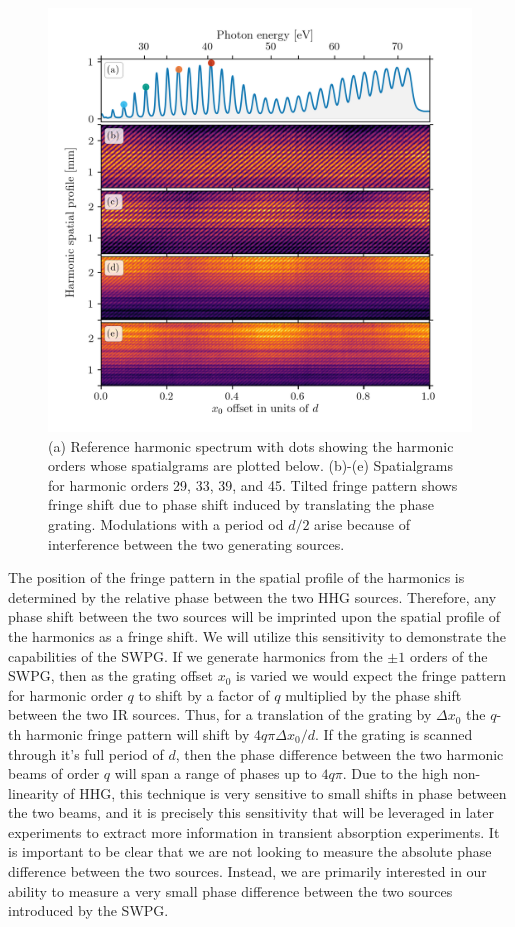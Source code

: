 \begin{figure}
	\centering
	\includegraphics[width=1.0\textwidth]{figures/Two_source/harmonic_spatialgrams.png}
	\caption{(a) Reference harmonic spectrum with dots showing the harmonic orders whose spatialgrams are plotted below. (b)-(e) Spatialgrams for harmonic orders 29, 33, 39, and 45.  Tilted fringe pattern shows fringe shift due to phase shift induced by translating the phase grating. Modulations with a period od $d/2$ arise because of interference between the two generating sources.}
	\label{fig:harmonic_spatialgrams}
\end{figure}

The position of the fringe pattern in the spatial profile of the harmonics is determined by the relative phase between the two HHG sources.  Therefore, any phase shift between the two sources will be imprinted upon the spatial profile of the harmonics as a fringe shift.  We will utilize this sensitivity to demonstrate the capabilities of the SWPG.  If we generate harmonics from the $\pm1$ orders of the SWPG, then as the grating offset $x_0$ is varied we would expect the fringe pattern for harmonic order $q$ to shift by a factor of $q$ multiplied by the phase shift between the two IR sources. Thus, for a translation of the grating by $\Delta x_0$ the $q$-th harmonic fringe pattern will shift by $4q\pi\Delta x_0/d$.  If the grating is scanned through it's full period of $d$, then the phase difference between the two harmonic beams of order $q$ will span a range of phases up to $4q\pi$.  Due to the high  non-linearity of HHG, this technique is very sensitive to small shifts in phase between the two beams, and it is precisely this sensitivity that will be leveraged in later experiments to extract more information in transient absorption experiments.  It is important to be clear that we are not looking to measure the absolute phase difference between the two sources.  Instead, we are primarily interested in our ability to measure a very small phase difference between the two sources introduced by the SWPG.

